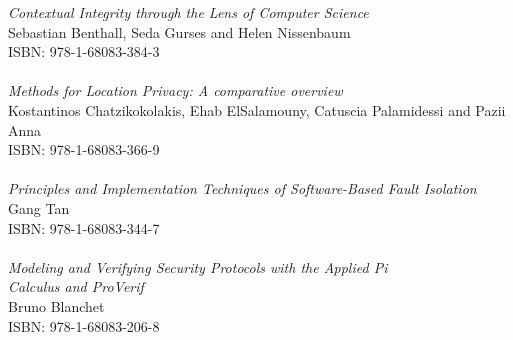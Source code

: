 \vspace{12pt}
\noindent \textit{Contextual Integrity through the Lens of Computer Science}\\
Sebastian Benthall, Seda Gurses and Helen Nissenbaum\\
ISBN: 978-1-68083-384-3\\
\\
\noindent \textit{Methods for Location Privacy: A comparative overview}\\
Kostantinos Chatzikokolakis, Ehab ElSalamouny, Catuscia Palamidessi and Pazii Anna\\
ISBN: 978-1-68083-366-9\\
\\
\noindent \textit{Principles and Implementation Techniques of Software-Based Fault Isolation}\\
Gang Tan\\
ISBN: 978-1-68083-344-7\\
\\
\noindent \textit{Modeling and Verifying Security Protocols with the Applied Pi\\ Calculus and ProVerif}\\
Bruno Blanchet\\
ISBN: 978-1-68083-206-8